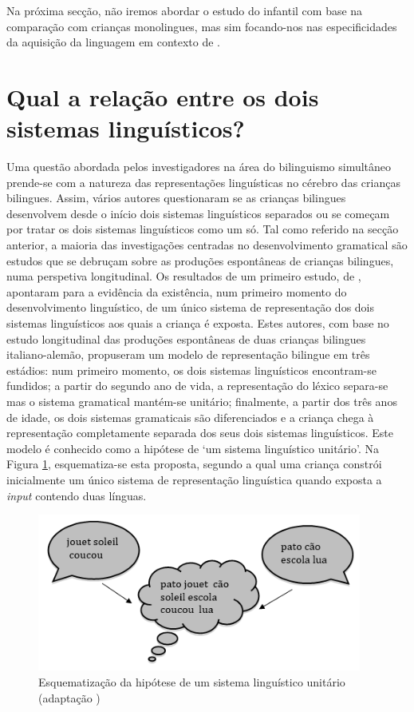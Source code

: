 \documentclass[output=paper]{LSP/langsci}
\begin{document}
Na próxima secção, não iremos abordar o estudo do  infantil com base na comparação com crianças monolingues, mas sim focando-nos nas especificidades da aquisição da linguagem em contexto de . 

\section{Qual a relação entre os dois sistemas linguísticos?}%
\label{sec:almeida_relacao}

Uma questão abordada pelos investigadores na área do bilinguismo simultâneo prende-se com a natureza das representações linguísticas no cérebro das crianças bilingues. Assim, vários autores questionaram se as crianças bilingues desenvolvem desde o início dois sistemas linguísticos separados ou se começam por tratar os dois sistemas linguísticos como um só. Tal como referido na secção anterior, a maioria das investigações centradas no desenvolvimento gramatical são estudos que se debruçam sobre as produções espontâneas de crianças bilingues, numa perspetiva longitudinal. Os resultados de um primeiro estudo, de \citet{volterrataeschner1978}, apontaram para a evidência da existência, num primeiro momento do desenvolvimento linguístico, de um único sistema de representação dos dois sistemas linguísticos aos quais a criança é exposta. Estes autores, com base no estudo longitudinal das produções espontâneas de duas crianças bilingues italiano-alemão, propuseram um modelo de representação bilingue em três estádios: num primeiro momento, os dois sistemas linguísticos encontram-se fundidos; a partir do segundo ano de vida, a representação do léxico separa-se mas o sistema gramatical mantém-se unitário; finalmente, a partir dos três anos de idade, os dois sistemas gramaticais são diferenciados e a criança chega à representação completamente separada dos seus dois sistemas linguísticos. Este modelo é conhecido como a hipótese de `um sistema linguístico unitário'. Na Figura \ref{fig:almeida_1}, esquematiza-se esta proposta, segundo a qual uma criança constrói inicialmente um único sistema de representação linguística quando exposta a \textit{input} contendo duas línguas. 

\begin{figure}
\includegraphics[width=0.95\textwidth]{figures/almeida_1}
\caption{Esquematização da hipótese de um sistema linguístico unitário (adaptação \citealt{genesee_etal2004})}
\label{fig:almeida_1}
\end{figure}
\end{document}
